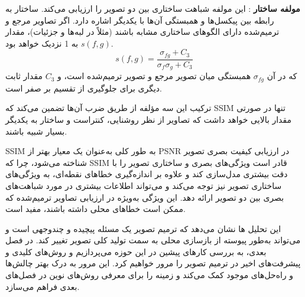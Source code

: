 \textbf{مولفه ساختار}
: این مولفه شباهت ساختاری بین دو تصویر را ارزیابی می‌کند. ساختار به رابطه بین پیکسل‌ها و همبستگی آن‌ها با یکدیگر اشاره دارد. اگر تصاویر مرجع و ترمیم‌شده دارای الگوهای ساختاری مشابه باشند (مثلاً در لبه‌ها و جزئیات)، مقدار $s(f, g)$ به 1 نزدیک خواهد بود.
$$
s(f, g) = \frac{\sigma_{fg} + C_3}{\sigma_f \sigma_g + C_3}
$$
که در آن $\sigma_{fg}$ همبستگی میان تصویر مرجع و تصویر ترمیم‌شده است، و $C_3$ مقدار ثابت دیگری برای جلوگیری از تقسیم بر صفر است.

ترکیب این سه مؤلفه از طریق ضرب آن‌ها تضمین می‌کند که SSIM تنها در صورتی مقدار بالایی خواهد داشت که تصاویر از نظر روشنایی، کنتراست و ساختار به یکدیگر بسیار شبیه باشند.

SSIM
به طور کلی به‌عنوان یک معیار بهتر از PSNR در ارزیابی کیفیت بصری تصویر شناخته می‌شود، چرا که SSIM قادر است ویژگی‌های بصری و ساختاری تصویر را با دقت بیشتری مدل‌سازی کند و علاوه بر اندازه‌گیری خطاهای نقطه‌ای، به ویژگی‌های ساختاری تصویر نیز توجه می‌کند و می‌تواند اطلاعات بیشتری در مورد شباهت‌های بصری بین دو تصویر ارائه دهد. این ویژگی به‌ویژه در ارزیابی تصاویر ترمیم‌شده که ممکن است خطاهای محلی داشته باشند، مفید است.



این تحلیل ها نشان می‌دهد که ترمیم تصویر یک مسئله پیچیده و چندوجهی است و می‌تواند به‌طور پیوسته از بازسازی محلی به سمت تولید کلی تصویر تغییر کند. در فصل بعدی، به بررسی کارهای پیشین در این حوزه می‌پردازیم و روش‌های کلیدی و پیشرفت‌های اخیر در ترمیم تصویر را مرور خواهیم کرد. این مرور به درک بهتر چالش‌ها و راه‌حل‌های موجود کمک می‌کند و زمینه را برای معرفی روش‌های نوین در فصل‌های بعدی فراهم می‌سازد.
